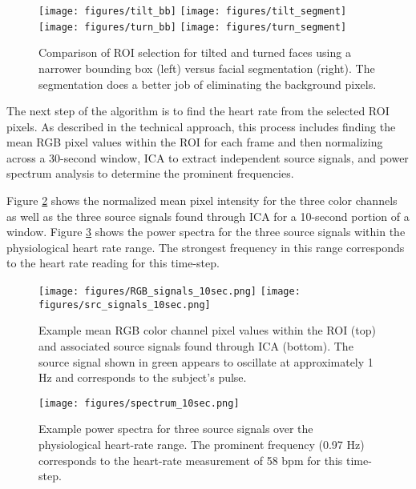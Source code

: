 \documentclass[10pt,twocolumn,letterpaper]{article}
\begin{document}
\begin{figure}
\begin{center}
	\texttt{[image: figures/tilt\_bb]}
	\texttt{[image: figures/tilt\_segment]}\\
	\texttt{[image: figures/turn\_bb]}
	\texttt{[image: figures/turn\_segment]}
\end{center}
\caption{Comparison of ROI selection for tilted and turned faces using a narrower bounding box (left) versus facial segmentation (right). The segmentation does a better job of eliminating the background pixels.}
\label{tilt_turn}
\end{figure}

The next step of the algorithm is to find the heart rate from the selected ROI pixels. As described in the technical approach, this process includes finding the mean RGB pixel values within the ROI for each frame and then normalizing across a 30-second window, ICA to extract independent source signals, and power spectrum analysis to determine the prominent frequencies.

Figure \ref{time_plots} shows the normalized mean pixel intensity for the three color channels as well as the three source signals found through ICA for a 10-second portion of a window. Figure \ref{freq_plot} shows the power spectra for the three source signals within the physiological heart rate range. The strongest frequency in this range corresponds to the heart rate reading for this time-step.

\begin{figure}
\begin{center}
	\texttt{[image: figures/RGB\_signals\_10sec.png]}
	\texttt{[image: figures/src\_signals\_10sec.png]}
\end{center}
\caption{Example mean RGB color channel pixel values within the ROI (top) and associated source signals found through ICA (bottom). The source signal shown in green appears to oscillate at approximately 1 Hz and corresponds to the subject's pulse. }
\label{time_plots}
\end{figure}

\begin{figure}
\begin{center}
	\texttt{[image: figures/spectrum\_10sec.png]}
\end{center}
\caption{Example power spectra for three source signals over the physiological heart-rate range. The prominent frequency (0.97 Hz) corresponds to the heart-rate measurement of 58 bpm for this time-step.}
\label{freq_plot}
\end{figure}
\end{document}
